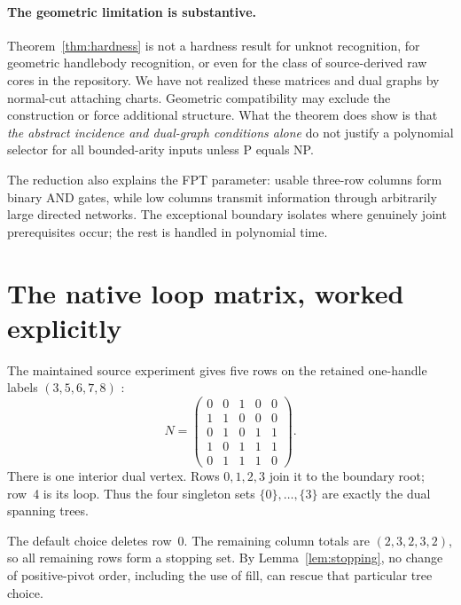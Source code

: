 \documentclass[11pt,letterpaper]{article}
\theoremstyle{definition}
\theoremstyle{remark}
\begin{document}
\paragraph{The geometric limitation is substantive.}
Theorem~\ref{thm:hardness} is not a hardness result for unknot recognition, for
geometric handlebody recognition, or even for the class of source-derived raw
cores in the repository. We have not realized these matrices and dual graphs by
normal-cut attaching charts. Geometric compatibility may exclude the construction
or force additional structure. What the theorem does show is that \emph{the
abstract incidence and dual-graph conditions alone} do not justify a polynomial
selector for all bounded-arity inputs unless P equals NP.

The reduction also explains the FPT parameter: usable three-row columns form
binary AND gates, while low columns transmit information through arbitrarily
large directed networks. The exceptional boundary isolates where genuinely
joint prerequisites occur; the rest is handled in polynomial time.

\section{The native loop matrix, worked explicitly}\label{sec:example}
The maintained source experiment gives five rows on the retained one-handle
labels $(3,5,6,7,8)$ \cite{repo-results}:
\begin{equation}\label{eq:loop-matrix}
N=\begin{pmatrix}
0&0&1&0&0\\
1&1&0&0&0\\
0&1&0&1&1\\
1&0&1&1&1\\
0&1&1&1&0
\end{pmatrix}.
\end{equation}
There is one interior dual vertex. Rows $0,1,2,3$ join it to the boundary root;
row~4 is its loop. Thus the four singleton sets $\{0\},\ldots,\{3\}$ are
exactly the dual spanning trees.

The default choice deletes row~0. The remaining column totals are
$(2,3,2,3,2)$, so all remaining rows form a stopping set. By
Lemma~\ref{lem:stopping}, no change of positive-pivot order, including the use
of fill, can rescue that particular tree choice.
\end{document}
